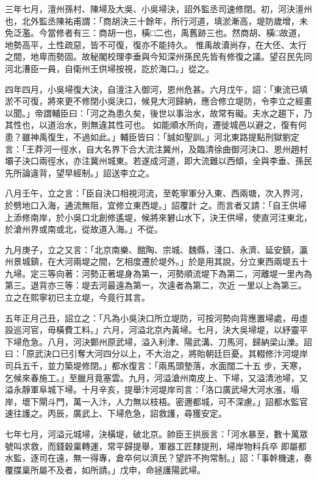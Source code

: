\begin{pinyinscope}
 三年七月，澶州孫村、陳埽及大吳、小吳埽決，詔外監丞司速修閉。初，河決澶州也，北外監丞陳祐甫謂：「商胡決三十餘年，所行河道，填淤漸高，堤防歲增，未免泛濫。今當修者有三：商胡一也，橫□二也，禹舊跡三也。然商胡、橫□故道，地勢高平，土性疏惡，皆不可復，復亦不能持久。
 惟禹故瀆尚存，在大伾、太行之間，地卑而勢固。故秘閣校理李垂與今知深州孫民先皆有修復之議。望召民先同河北漕臣一員，自衛州王供埽按視，訖於海口。」從之。



 四年四月，小吳埽復大決，自澶注入御河，恩州危甚。六月戊午，詔：「東流已填淤不可復，將來更不修閉小吳決口，候見大河歸納，應合修立堤防，令李立之經畫以聞。」帝謂輔臣曰：「河之為患久矣，後世以事治水，故常有礙。夫水之趨下，乃其性也，以道治水，則無違其性可也。
 如能順水所向，遷徙城邑以避之，復有何患？雖神禹復生，不過如此。」輔臣皆曰：「誠如聖訓。」河北東路提點刑獄劉定言：「王莽河一徑水，自大名界下合大流注冀州，及臨清徐曲御河決口、恩州趙村壩子決口兩徑水，亦注冀州城東。若遂成河道，即大流難以西傾，全與李垂、孫民先所論違背，望早經制。」詔送李立之。



 八月壬午，立之言：「臣自決口相視河流，至乾寧軍分入東、西兩塘，次入界河，於劈地口入海，通流無阻，宜修立東西堤。」詔覆計
 之。而言者又請：「自王供埽上添修南岸，於小吳口北創修遙堤，候將來礬山水下，決王供埽，使直河注東北，於滄州界或南或北，從故道入海。」不從。



 九月庚子，立之又言：「北京南樂、館陶、宗城、魏縣，淺口、永濟、延安鎮，瀛州景城鎮，在大河兩堤之間，乞相度遷於堤外。」於是用其說，分立東西兩堤五十九埽。定三等向著：河勢正著堤身為第一，河勢順流堤下為第二，河離堤一里內為第三。退背亦三等：堤去河最遠為第一，次遠者為第二，次近
 一里以上為第三。立之在熙寧初已主立堤，今竟行其言。



 五年正月己丑，詔立之：「凡為小吳決口所立堤防，可按河勢向背應置埽處，毋虛設巡河官，毋橫費工料。」六月，河溢北京內黃埽。七月，決大吳埽堤，以紓靈平下埽危急。八月，河決鄭州原武埽，溢入利津、陽武溝、刀馬河，歸納梁山濼。詔曰：「原武決口已引奪大河四分以上，不大治之，將貽朝廷巨憂。其輟修汴河堤岸司兵五千，並力築堤修閉。」都水復言：「兩馬頭墊落，水面闊二十五
 步，天寒，乞候來春施工。」至臘月竟塞雲。九月，河溢滄州南皮上、下埽，又溢清池埽，又溢永靜軍阜城下埽。十月辛亥，提舉汴河堤岸司言：「洛口廣武埽大河水漲，塌岸，壞下閘斗門，萬一入汴，人力無以枝梧。密邇都城，可不深慮。」詔都水監官速往護之。丙辰，廣武上、下埽危急，詔救護，尋獲安定。



 七年七月，河溢元城埽，決橫堤，破北京。帥臣王拱辰言：「河水暴至，數十萬眾號叫求救，而錢穀稟轉運，常平歸提舉，軍器工匠隸提刑，埽岸物料兵卒
 即屬都水監，逐司在遠，無一得專，倉卒何以濟民？望許不拘常制。」詔：「事幹機速，奏覆牒稟所屬不及者，如所請。」戊申，命拯護陽武埽。




\end{pinyinscope}

